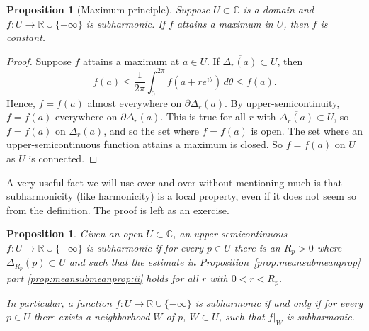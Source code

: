\documentclass[12pt,openany]{book}
\newcommand{\C}{{\mathbb{C}}}
\newcommand{\R}{{\mathbb{R}}}
\theoremstyle{plain}
\newtheorem{prop}[thm]{Proposition}
\theoremstyle{remark}
\theoremstyle{definition}
\theoremstyle{exercise}
\theoremstyle{example}
\newcommand{\propref}[1]{\hyperref[#1]{Proposition~\ref*{#1}}}
\begin{document}
\begin{prop}[Maximum principle]
Suppose $U \subset \C$ is a domain and $f \colon U \to \R \cup \{ -\infty \}$
is subharmonic.  If $f$ attains a maximum in $U$, then $f$ is constant.
\end{prop}

\begin{proof}
Suppose $f$ attains a maximum at $a \in U$.
If
$\overline{\Delta_r(a)} \subset U$, then
\begin{equation*}
f(a) \leq \frac{1}{2\pi} \int_0^{2\pi} f(a+re^{i\theta})\, d\theta \leq f(a)
.
\end{equation*}
Hence, $f = f(a)$ almost everywhere on $\partial \Delta_r(a)$.
By upper-semicontinuity, $f = f(a)$ everywhere on $\partial \Delta_r(a)$.
This is true for all $r$
with $\overline{\Delta_r(a)} \subset U$, so $f=f(a)$ on $\Delta_r(a)$,
and so the set where $f=f(a)$ is open.  The set where an upper-semicontinuous
function attains a maximum is closed.  So $f=f(a)$ on $U$ as $U$ is
connected.
\end{proof}

A very useful fact we will use over and over without mentioning much is that subharmonicity
(like harmonicity)
is a local property,
even if it does not seem so from the definition.
The proof is left as an exercise.

\begin{prop} \label{prop:shlocal}
Given an open
$U \subset \C$, an upper-semicontinuous $f \colon U \to \R \cup \{ -\infty \}$
is subharmonic if
for every $p \in U$ there is an $R_p > 0$ where $\Delta_{R_p}(p) \subset U$ 
and such that the estimate in
\propref{prop:meansubmeanprop} part \ref{prop:meansubmeanprop:ii}
holds for all $r$ with $0 < r < R_p$.

In particular,
a function $f \colon U \to \R \cup \{ -\infty \}$ is subharmonic if
and only if for every $p \in U$ there exists a neighborhood $W$ of $p$,
$W \subset U$, such that $f|_{W}$ is subharmonic.
\end{prop}
\end{document}
